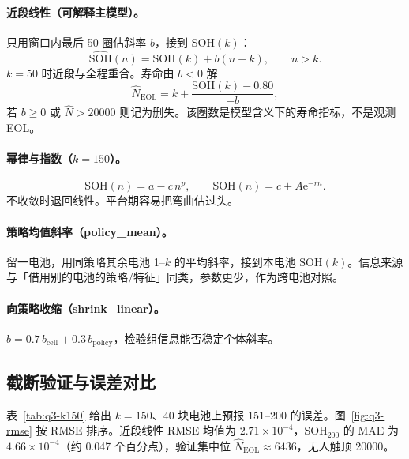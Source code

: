 \paragraph{近段线性（可解释主模型）。}
只用窗口内最后 50 圈估斜率 \(b\)，接到 \(\mathrm{SOH}(k)\)：
\begin{equation}
\widehat{\mathrm{SOH}}(n)=\mathrm{SOH}(k)+b(n-k),\qquad n>k.
\label{eq:q3-linear-recent}
\end{equation}
\(k=50\) 时近段与全程重合。寿命由 \(b<0\) 解
\begin{equation}
\hat N_{\mathrm{EOL}}=k+\frac{\mathrm{SOH}(k)-0.80}{-b},
\label{eq:q3-eol}
\end{equation}
若 \(b\ge 0\) 或 \(\hat N>20000\) 则记为删失。该圈数是模型含义下的寿命指标，不是观测 EOL。

\paragraph{幂律与指数（\(k=150\)）。}
\begin{equation}
\mathrm{SOH}(n)=a-c\,n^{p},\qquad
\mathrm{SOH}(n)=c+A\mathrm{e}^{-rn}.
\label{eq:q3-nl}
\end{equation}
不收敛时退回线性。平台期容易把弯曲估过头。

\paragraph{策略均值斜率（policy\_mean）。}
留一电池，用同策略其余电池 1--\(k\) 的平均斜率，接到本电池 \(\mathrm{SOH}(k)\)。信息来源与「借用别的电池的策略/特征」同类，参数更少，作为跨电池对照。

\paragraph{向策略收缩（shrink\_linear）。}
\(b=0.7\,b_{\mathrm{cell}}+0.3\,b_{\mathrm{policy}}\)，检验组信息能否稳定个体斜率。

\subsection{截断验证与误差对比}

表~\ref{tab:q3-k150} 给出 \(k=150\)、40 块电池上预报 151--200 的误差。图~\ref{fig:q3-rmse} 按 RMSE 排序。近段线性 RMSE 均值为 \(2.71\times 10^{-4}\)，\(\mathrm{SOH}_{200}\) 的 MAE 为 \(4.66\times 10^{-4}\)（约 0.047 个百分点），验证集中位 \(\hat N_{\mathrm{EOL}}\approx 6436\)，无人触顶 20000。

